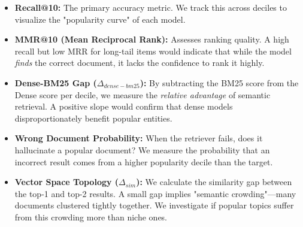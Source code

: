 \documentclass{article}
\begin{document}
\begin{itemize}
    \item \textbf{Recall@10:} The primary accuracy metric. We track this across deciles to visualize the "popularity curve" of each model.
    \item \textbf{MMR@10 (Mean Reciprocal Rank):} Assesses ranking quality. A high recall but low MRR for long-tail items would indicate that while the model \textit{finds} the correct document, it lacks the confidence to rank it highly.
    \item \textbf{Dense-BM25 Gap ($\Delta_{dense-bm25}$):} By subtracting the BM25 score from the Dense score per decile, we measure the \textit{relative advantage} of semantic retrieval. A positive slope would confirm that dense models disproportionately benefit popular entities.
    \item \textbf{Wrong Document Probability:} When the retriever fails, does it hallucinate a popular document? We measure the probability that an incorrect result comes from a higher popularity decile than the target.
    \item \textbf{Vector Space Topology ($\Delta_{sim}$):} We calculate the similarity gap between the top-1 and top-2 results. A small gap implies "semantic crowding"—many documents clustered tightly together. We investigate if popular topics suffer from this crowding more than niche ones.
\end{itemize}
\end{document}
